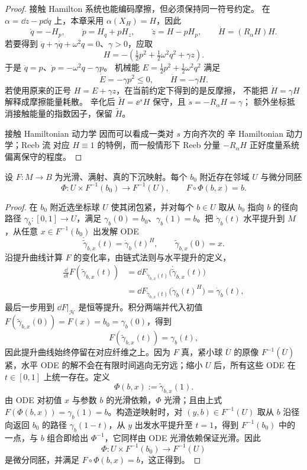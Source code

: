\begin{proof}
接触 Hamilton 系统也能编码摩擦，但必须保持同一符号约定。
在 $\alpha=\dd z-p\dd q$ 上，本章采用 $\alpha(X_H)=H$，因此
\[
\dot q=-H_p,\qquad\dot p=H_q+pH_z,
\qquad\dot z=H-pH_p,
\qquad\dot H=(R_\alpha H)H.
\]
若要得到 $\ddot q+\gamma\dot q+\omega^2q=0$、$\gamma>0$，应取
\[
H=-\left(\tfrac12p^2+\tfrac12\omega^2q^2+\gamma z\right).
\]
于是 $\dot q=p$、$\dot p=-\omega^2q-\gamma p$。
机械能 $E=\tfrac12p^2+\tfrac12\omega^2q^2$ 满足
\[
\dot E=-\gamma p^2\le0,\qquad\dot H=-\gamma H.
\]
若使用原来的正号 $H=E+\gamma z$，在当前约定下得到的是反摩擦，
不能把 $\dot H=\gamma H$ 解释成摩擦能量耗散。
辛化后 $\widetilde H=\ee^sH$ 保守，且 $\dot s=-R_\alpha H=\gamma$；
额外坐标抵消接触能量的指数因子，保留 $\widetilde H$。

接触 Hamiltonian 动力学 因而可以看成一类对 $s$ 方向齐次的 辛 Hamiltonian 动力学；Reeb 流 对应 $H\equiv1$ 的特例，而一般情形下 Reeb 分量 $-R_\alpha H$ 正好度量系统偏离保守的程度。
\end{proof}

\begin{theorem}
设 $F:M\to B$ 为光滑、满射、真的下沉映射。每个 $b_0$ 附近存在邻域 $U$ 与微分同胚\[\Phi:U\times F^{-1}(b_0)\to F^{-1}(U),\qquad F\circ\Phi(b,x)=b.\]
\end{theorem}

\begin{proof}
在 $b_0$ 附近选坐标球 $U$ 使其闭包紧，并对每个 $b\in U$ 取从 $b_0$ 指向 $b$ 的径向路径 $\gamma_b:[0,1]\to U$，满足 $\gamma_b(0)=b_0$、$\gamma_b(1)=b$。把 $\dot\gamma_b(t)$ 水平提升到 $M$，从任意 $x\in F^{-1}(b_0)$ 出发解 ODE
\[
\dot{\widetilde\gamma}_{b,x}(t)
=\dot\gamma_b(t)^H,
\qquad
\widetilde\gamma_{b,x}(0)=x.
\]
沿提升曲线计算 $F$ 的变化率，由链式法则与水平提升的定义，
\begin{align*}
\frac{\dd}{\dd t}F(\widetilde\gamma_{b,x}(t))
&=\dd F_{\widetilde\gamma_{b,x}(t)}\bigl(\dot{\widetilde\gamma}_{b,x}(t)\bigr)\\
&=\dd F_{\widetilde\gamma_{b,x}(t)}\bigl(\dot\gamma_b(t)^H\bigr)
=\dot\gamma_b(t),
\end{align*}
最后一步用到 $\dd F|_{\mathcal H}$ 是恒等提升。积分两端并代入初值 $F(\widetilde\gamma_{b,x}(0))=F(x)=b_0=\gamma_b(0)$，得到
\[
F(\widetilde\gamma_{b,x}(t))=\gamma_b(t),
\]
因此提升曲线始终停留在对应纤维之上。因为 $F$ 真，紧小球 $\overline U$ 的原像 $F^{-1}(\overline U)$ 紧，水平 ODE 的解不会在有限时间逃向无穷远；缩小 $U$ 后，所有这些 ODE 在 $t\in[0,1]$ 上统一存在。定义
\[
\Phi(b,x):=\widetilde\gamma_{b,x}(1).
\]
由 ODE 对初值 $x$ 与参数 $b$ 的光滑依赖，$\Phi$ 光滑；且由上式 $F(\Phi(b,x))=\gamma_b(1)=b$。构造逆映射时，对 $(y,b)\in F^{-1}(U)$ 取从 $b$ 沿径向返回 $b_0$ 的路径 $\gamma_b(1-t)$，从 $y$ 出发水平提升至 $t=1$，得到 $F^{-1}(b_0)$ 中的一点，与 $b$ 组合即给出 $\Phi^{-1}$，它同样由 ODE 光滑依赖保证光滑。因此
\[
\Phi:U\times F^{-1}(b_0)\to F^{-1}(U)
\]
是微分同胚，并满足 $F\circ\Phi(b,x)=b$，这正得到。
\end{proof}

